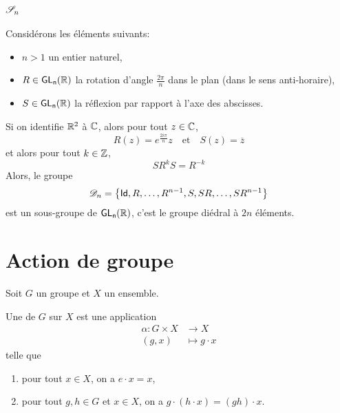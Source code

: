 \subsection*{\(\mathscr{S}_n\)}\label{subsec:sn}

Considérons les éléments suivants:
\begin{itemize}
    \item \(n > 1\) un entier naturel,
    \item \(R \in \operatorname{\mathsf{GL_{n}}}(\mathbb{R})\) la rotation d'angle \(\frac{2\pi}{n}\)
    dans le plan (dans le sens anti-horaire),
    \item \(S \in \operatorname{\mathsf{GL_{n}}}(\mathbb{R})\) la réflexion par rapport à l'axe des abscisses.
\end{itemize}

Si on identifie \(\mathbb{R}^2\) à \(\mathbb{C}\), alors pour tout \(z \in \mathbb{C}\),
    \begin{equation*}
        R(z) = e^{\frac{2i\pi}{n}}z \quad\text{et}\quad S(z) = \overline{z}
    \end{equation*}
    et alors pour tout \(k \in \mathbb{Z}\),
    \begin{equation*}
        S R^k S = R^{-k}
    \end{equation*}
    Alors, le groupe
    \begin{equation*}
        \mathscr{D}_n = \left\{ \operatorname{\mathsf{Id}}, R, \ldots, R^{n-1}, S, SR, \ldots, SR^{n-1} \right\}
    \end{equation*}
    est un sous-groupe de \(\operatorname{\mathsf{GL_{n}}}(\mathbb{R})\), c'est le groupe diédral à \(2n\) éléments.


\section{Action de groupe}\label{sec:action-de-groupe}

Soit \(G\) un groupe et \(X\) un ensemble.

\begin{definition}
    Une  de \(G\) sur \(X\) est une application
    \begin{equation*}
        \begin{aligned}
            \alpha : G \times X &\to X\\
            (g,x) &\mapsto g \cdot x
        \end{aligned}
    \end{equation*}
    telle que
    \begin{enumerate}[label=(\roman*)]
        \item pour tout \(x \in X\), on a \(e \cdot x = x\),
        \item pour tout \(g,h \in G\) et \(x \in X\), on a \(g \cdot (h \cdot x) = (gh) \cdot x\).
    \end{enumerate}
\end{definition}

